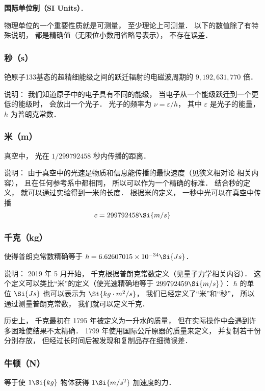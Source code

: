 

\textbf{国际单位制（SI Units）}．

物理单位的一个重要性质就是可测量， 至少理论上可测量． 以下的数值除了有特殊说明， 都是精确值（无限位小数用省略号表示）， 不存在误差．

\subsubsection{秒（s）}
铯原子133基态的超精细能级之间的跃迁辐射的电磁波周期的 $9, 192, 631, 770$ 倍． 

说明： 我们知道原子中的电子具有不同的能级， 当电子从一个能级跃迁到一个更低的能级时， 会放出一个光子． 光子的频率为 $\nu  = \varepsilon /h$，   其中 $\varepsilon $ 是光子的能量， $h$ 为普朗克常数．

\subsubsection{米（m）}
真空中， 光在 $1/299792458$ 秒内传播的距离．

说明： 由于真空中的光速是物质和信息能传播的最快速度（见狭义相对论 相关内容）， 且在任何参考系中都相同， 所以可以作为一个精确的标准． 结合秒的定义， 就可以通过实验得到一米的长度． 根据米的定义， 一秒中光可以在真空中传播
\begin{equation}
c = 299792458 \Si{m/s}
\end{equation}

\subsubsection{千克（kg）}
使得普朗克常数精确等于 $\hbar = 6.62607015\times10^{-34}\Si{Js}$．

说明： 2019 年 5 月开始， 千克根据普朗克常数定义（见量子力学相关内容）． 这个定义可以类比“米”的定义（使光速精确地等于 $299792459\Si{m/s}$）： $\hbar$ 的单位 $\Si{Js}$ 也可以表示为 $\Si{kg\cdot m^2/s}$， 我们已经定义了“米”和“秒”， 所以通过测量普朗克常数， 我们就可以定义千克．

历史上， 千克最初在 1795 年被定义为一升水的质量， 但在实际操作中会遇到许多困难使结果不太精确． 1799 年使用国际公斤原器的质量来定义， 并复制若干份分别存放， 但经过长时间后被发现和复制品存在细微误差．

\subsubsection{牛顿（N）}
等于使 $1\Si{kg}$ 物体获得 $1\Si{m/s^2}$ 加速度的力．

